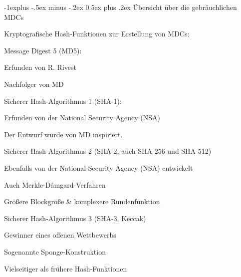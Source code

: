 \documentclass[a4paper]{article}
\makeatletter
\renewcommand{\subsection}{\@startsection{subsection}{2}{0mm}%
 {-1explus -.5ex minus -.2ex}%
 {0.5ex plus .2ex}%
 {\normalfont\normalsize\bfseries}}
\makeatother
\begin{document}
\begin{multicols}{3}
      \subsection{Übersicht über die gebräuchlichen MDCs}
      \begin{itemize*}
            \item Kryptografische Hash-Funktionen zur Erstellung von MDCs:
            \begin{itemize*}
                  \item Message Digest 5 (MD5):
                  \begin{itemize*}
                        \item Erfunden von R. Rivest
                        \item Nachfolger von MD
                  \end{itemize*}
                  \item Sicherer Hash-Algorithmus 1 (SHA-1):
                  \begin{itemize*}
                        \item Erfunden von der National Security Agency (NSA)
                        \item Der Entwurf wurde von MD inspiriert.
                  \end{itemize*}
                  \item Sicherer Hash-Algorithmus 2 (SHA-2, auch SHA-256 und SHA-512)
                  \begin{itemize*}
                        \item Ebenfalls von der National Security Agency (NSA) entwickelt
                        \item Auch Merkle-Dåmgard-Verfahren
                        \item Größere Blockgröße \& komplexere Rundenfunktion
                  \end{itemize*}
                  \item Sicherer Hash-Algorithmus 3 (SHA-3, Keccak)
                  \begin{itemize*}
                        \item Gewinner eines offenen Wettbewerbs
                        \item Sogenannte Sponge-Konstruktion
                        \item Vielseitiger als frühere Hash-Funktionen
                  \end{itemize*}
            \end{itemize*}

\end{itemize*}
\end{multicols}
\end{document}
